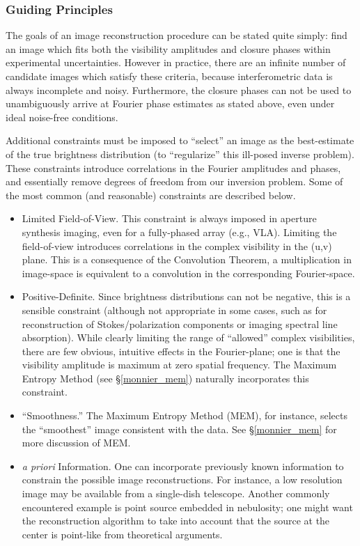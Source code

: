 \documentclass[12pt]{iopart}
\begin{document}
\subsubsection{Guiding Principles}
The goals of an image reconstruction procedure can be stated quite
simply: find an image which fits both the visibility amplitudes and
closure phases within experimental uncertainties.  However in
practice, there are an infinite number of candidate images which
satisfy these criteria, because interferometric data is always
incomplete and noisy.  Furthermore, the closure phases can not be used
to unambiguously arrive at Fourier phase estimates as stated above,
even under ideal noise-free conditions.

Additional constraints must be imposed to ``select'' an image as the
best-estimate of the true brightness distribution (to ``regularize''
this ill-posed inverse problem). These constraints introduce
correlations in the Fourier amplitudes and phases, and essentially
remove degrees of freedom from our inversion problem. Some of the most
common (and reasonable) constraints are described below.
\begin{itemize}
\item{Limited Field-of-View.  This constraint is always imposed in
    aperture synthesis imaging, even for a fully-phased array (e.g.,
    VLA).  Limiting the field-of-view introduces correlations in the
    complex visibility in the (u,v) plane.  This is a consequence of
    the Convolution Theorem, a multiplication in image-space
    is equivalent to a convolution in the corresponding
    Fourier-space.}
\item{Positive-Definite.  Since brightness distributions can not be
    negative, this is a sensible constraint (although not appropriate
    in some cases, such as for reconstruction of Stokes/polarization
    components or imaging spectral line absorption).  While clearly
    limiting the range of ``allowed'' complex visibilities, there are
    few obvious, intuitive effects in the Fourier-plane; one is that
    the visibility amplitude is maximum at zero spatial frequency.
    The Maximum Entropy Method (see \S\ref{monnier_mem}) naturally
    incorporates this constraint.}
\item{``Smoothness.''  The Maximum Entropy Method (MEM), for instance,
    selects the ``smoothest'' image consistent with the data. 
See \S\ref{monnier_mem} for more discussion of MEM. }
\item{{\em a priori} Information.  One can incorporate previously
    known information to constrain the possible image reconstructions.
    For instance, a low resolution image may be available from a
    single-dish telescope.  Another commonly encountered example is
    point source embedded in nebulosity; one might want the
    reconstruction algorithm to take into account that the source at
    the center is point-like from theoretical arguments. }
\end{itemize}
\end{document}
